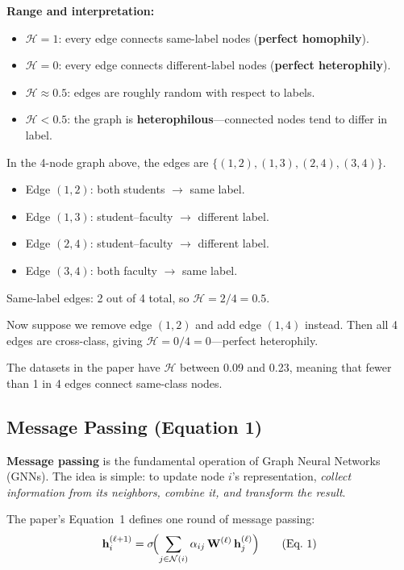 \documentclass[11pt,a4paper]{article}
\newcommand{\N}{\mathcal{N}}
\newcommand{\bW}{\mathbf{W}}
\newcommand{\bh}{\mathbf{h}}
\theoremstyle{definition}
\theoremstyle{plain}
\begin{document}
\textbf{Range and interpretation:}
\begin{itemize}[nosep]
  \item $\mathcal{H} = 1$: every edge connects same-label nodes (\textbf{perfect homophily}).
  \item $\mathcal{H} = 0$: every edge connects different-label nodes
    (\textbf{perfect heterophily}).
  \item $\mathcal{H} \approx 0.5$: edges are roughly random with respect to labels.
  \item $\mathcal{H} < 0.5$: the graph is \textbf{heterophilous}---connected
    nodes tend to differ in label.
\end{itemize}

\begin{example}
In the 4-node graph above, the edges are $\{(1,2), (1,3), (2,4), (3,4)\}$.
\begin{itemize}[nosep]
  \item Edge $(1,2)$: both students $\to$ same label.
  \item Edge $(1,3)$: student--faculty $\to$ different label.
  \item Edge $(2,4)$: student--faculty $\to$ different label.
  \item Edge $(3,4)$: both faculty $\to$ same label.
\end{itemize}
Same-label edges: 2 out of 4 total, so $\mathcal{H} = 2/4 = 0.5$.

Now suppose we remove edge $(1,2)$ and add edge $(1,4)$ instead.
Then all 4 edges are cross-class, giving $\mathcal{H} = 0/4 = 0$---perfect heterophily.

The datasets in the paper have $\mathcal{H}$ between 0.09 and 0.23, meaning that
fewer than 1 in 4 edges connect same-class nodes.
\end{example}


\subsection{Message Passing (Equation 1)}
\label{sec:message_passing}

\textbf{Message passing} is the fundamental operation of Graph Neural Networks (GNNs).
The idea is simple: to update node $i$'s representation, \emph{collect information
from its neighbors, combine it, and transform the result}.

The paper's Equation~1 defines one round of message passing:
\begin{equation}
  \bh_i^{(\ell+1)} = \sigma\!\Bigl(\sum_{j \in \N(i)} \alpha_{ij}\, \bW^{(\ell)}\, \bh_j^{(\ell)}\Bigr)
  \tag{Eq.~1}
\end{equation}
\end{document}
